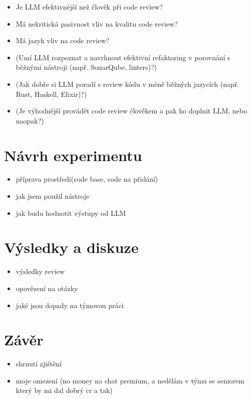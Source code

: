 \documentclass[12pt, a4paper]{article}
\begin{document}
\begin{itemize}
  \item Je LLM efektivnější než člověk při code review?
  \item Má nekritická pasivnost vliv na kvalitu code review?
  \item Má jazyk vliv na code review?
  \item (Umí LLM rozpoznat a navrhnout efektivní refaktoring v porovnání s běžnými nástroji (např. SonarQube, linters)?)
  \item (Jak dobře si LLM poradí s review kódu v méně běžných jazycích (např. Rust, Haskell, Elixir)?)
  \item (Je výhodnější provádět code review člověkem a pak ho doplnit LLM, nebo naopak?)
\end{itemize}

\section{Návrh experimentu}

\begin{itemize}
  \item příprava prostředí(code base, code na přidání)
  \item jak jsem použil nástroje
  \item jak budu hodnotit výstupy od LLM
\end{itemize}

\section{Výsledky a diskuze}

\begin{itemize}
  \item výsledky review
  \item opovězení na otázky
  \item jaké jsou dopady na týmovou práci
\end{itemize}

\section{Závěr}

\begin{itemize}
  \item shrnutí zjištění
  \item moje omezení (no money na chat premium, a nedělám v týmu se seniorem který by mi dal dobrý cr a tak)
\end{itemize}


\end{document}
